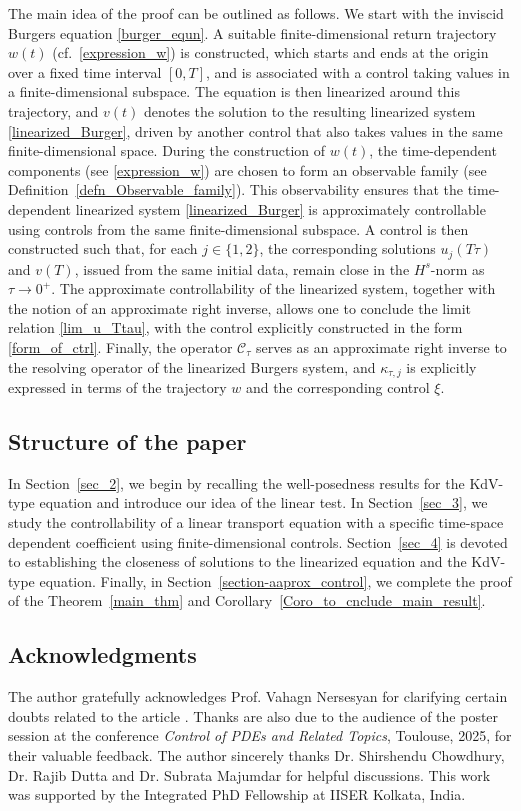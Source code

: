 \documentclass[10pt, reqno]{amsart}
\numberwithin{equation}{section}
\begin{document}
The main idea of the proof can be outlined as follows. We start with the inviscid Burgers equation \eqref{burger_equn}. A suitable finite-dimensional return trajectory $w(t)$ (cf.~\eqref{expression_w}) is constructed, which starts and ends at the origin over a fixed time interval $[0,T]$, and is associated with a control taking values in a finite-dimensional subspace. The equation is then linearized around this trajectory, and $v(t)$ denotes the solution to the resulting linearized system \eqref{linearized_Burger}, driven by another control that also takes values in the same finite-dimensional space. During the construction of $w(t)$, the time-dependent components (see \eqref{expression_w}) are chosen to form an observable family (see Definition~\ref{defn_Observable_family}). This observability ensures that the time-dependent linearized system \eqref{linearized_Burger} is approximately controllable using controls from the same finite-dimensional subspace. A control is then constructed such that, for each $j \in \{1,2\}$, the corresponding solutions $u_j(T\tau)$ and $v(T)$, issued from the same initial data, remain close in the $H^s$-norm as $\tau \to 0^+$. The approximate controllability of the linearized system, together with the notion of an approximate right inverse, allows one to conclude the limit relation \eqref{lim_u_Ttau}, with the control explicitly constructed in the form \eqref{form_of_ctrl}. Finally, the operator $\mathcal{C}_\tau$ serves as an approximate right inverse to the resolving operator of the linearized Burgers system, and $\kappa_{\tau,j}$ is explicitly expressed in terms of the trajectory $w$ and the corresponding control $\xi$.




\subsection{Structure of the paper} In Section~\ref{sec_2}, we begin by recalling the well-posedness results for the KdV-type equation and introduce our idea of the linear test. In Section~\ref{sec_3}, we study the controllability of a linear transport equation with a specific time-space dependent coefficient using finite-dimensional controls. Section~\ref{sec_4} is devoted to establishing the closeness of solutions to the linearized equation and the KdV-type equation. Finally, in Section~\ref{section-aaprox_control}, we complete the proof of the Theorem~\ref{main_thm} and Corollary~\ref{Coro_to_cnclude_main_result}.

\subsection*{Acknowledgments}  
The author gratefully acknowledges Prof. Vahagn Nersesyan for clarifying certain doubts related to the article \cite{Nersesyan_2021_Sicon}. Thanks are also due to the audience of the poster session at the conference \textit{Control of PDEs and Related Topics}, Toulouse, 2025, for their valuable feedback. The author sincerely thanks Dr. Shirshendu Chowdhury, Dr. Rajib Dutta and Dr. Subrata Majumdar for helpful discussions. This work was supported by the Integrated PhD Fellowship at IISER Kolkata, India.
\end{document}
